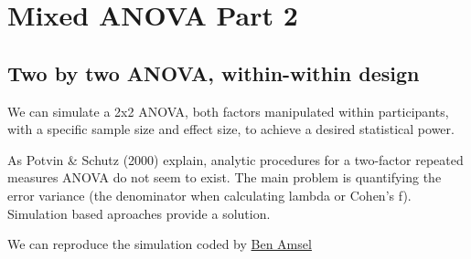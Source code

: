 \documentclass[]{book}
\begin{document}
\hypertarget{mixed-anova-part-2}{%
\chapter{Mixed ANOVA Part 2}\label{mixed-anova-part-2}}

\hypertarget{two-by-two-anova-within-within-design}{%
\section{Two by two ANOVA, within-within design}\label{two-by-two-anova-within-within-design}}

We can simulate a 2x2 ANOVA, both factors manipulated within participants, with a specific sample size and effect size, to achieve a desired statistical power.

As Potvin \& Schutz (2000) explain, analytic procedures for a two-factor repeated measures ANOVA do not seem to exist. The main problem is quantifying the error variance (the denominator when calculating lambda or Cohen's f). Simulation based aproaches provide a solution.

We can reproduce the simulation coded by \href{https://cognitivedatascientist.com/2015/12/14/power-simulation-in-r-the-repeated-measures-anova-5/}{Ben Amsel}
\end{document}
